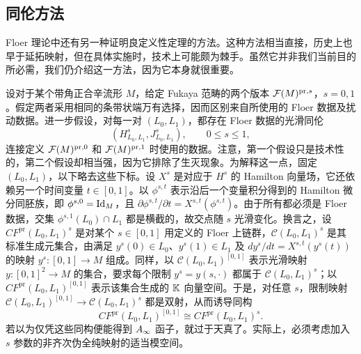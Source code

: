 \subsection{同伦方法}\label{sec:10e}
Floer 理论中还有另一种证明良定义性定理的方法。这种方法相当直接，历史上也早于延拓映射，但在具体实施时，技术上可能颇为棘手。虽然它并非我们当前目的所必需，我们仍介绍这一方法，因为它本身就很重要。

设对于某个带角正合辛流形 $M$，给定 Fukaya 范畴的两个版本 $\mathcal F(M)^{\mathrm{pr},s}$，$s=0,1$。假定两者采用相同的条带状端万有选择，因而区别来自所使用的 Floer 数据及扰动数据。进一步假设，对每一对 $(L_0,L_1)$，都存在 Floer 数据的光滑同伦
\begin{equation}\label{eq:10.10}
(H^s_{L_0,L_1},J^s_{L_0,L_1}),\qquad 0\leq s\leq1,
\end{equation}
连接定义 $\mathcal F(M)^{\mathrm{pr},0}$ 和 $\mathcal F(M)^{\mathrm{pr},1}$ 时使用的数据。注意，第一个假设只是技术性的，第二个假设却相当强，因为它排除了生灭现象。为解释这一点，固定 $(L_0,L_1)$，以下略去这些下标。设 $X^s$ 是对应于 $H^s$ 的 Hamilton 向量场，它还依赖另一个时间变量 $t\in[0,1]$。以 $\phi^{s,t}$ 表示沿后一个变量积分得到的 Hamilton 微分同胚族，即 $\phi^{s,0}=\operatorname{Id}_M$，且 $\partial\phi^{s,t}/\partial t=X^{s,t}(\phi^{s,t})$。由于所有都必须是 Floer 数据，交集 $\phi^{s,1}(L_0)\cap L_1$ 都是横截的，故交点随 $s$ 光滑变化。换言之，设 $CF^{\mathrm{pr}}(L_0,L_1)^s$ 是对某个 $s\in[0,1]$ 用定义的 Floer 上链群，$\mathcal C(L_0,L_1)^s$ 是其标准生成元集合，由满足 $y^s(0)\in L_0$、$y^s(1)\in L_1$ 及 $dy^s/dt=X^{s,t}(y^s(t))$ 的映射 $y^s:[0,1]\to M$ 组成。同样，以 $\mathcal C(L_0,L_1)^{[0,1]}$ 表示光滑映射 $y:[0,1]^2\to M$ 的集合，要求每个限制 $y^s=y(s,\cdot)$ 都属于 $\mathcal C(L_0,L_1)^s$；以 $CF^{\mathrm{pr}}(L_0,L_1)^{[0,1]}$ 表示该集合生成的 $\mathbb K$ 向量空间。于是，对任意 $s$，限制映射 $\mathcal C(L_0,L_1)^{[0,1]}\to \mathcal C(L_0,L_1)^s$ 都是双射，从而诱导同构
\begin{equation}\label{eq:10.11}
CF^{\mathrm{pr}}(L_0,L_1)^{[0,1]}\cong CF^{\mathrm{pr}}(L_0,L_1)^s.
\end{equation}
若以为仅凭这些同构便能得到 $A_\infty$ 函子，就过于天真了。实际上，必须考虑加入 $s$ 参数的非齐次伪全纯映射的适当模空间。
